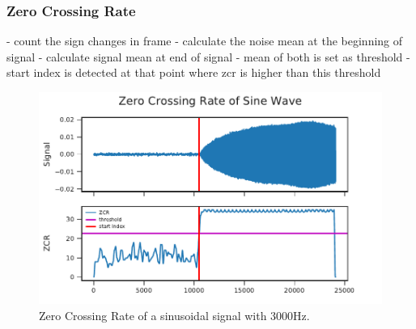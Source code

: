 \subsubsection*{Zero Crossing Rate}

- count the sign changes in frame
- calculate the noise mean at the beginning of signal
- calculate signal mean at end of signal
- mean of both is set as threshold
- start index is detected at that point where zcr is higher than this threshold

\begin{figure}[ht]
	\centering
		\includegraphics[]{figures/sine_zcr}
	\caption{Zero Crossing Rate of a sinusoidal signal with 3000Hz.}
\end{figure}
\label{fig:03_zcr}